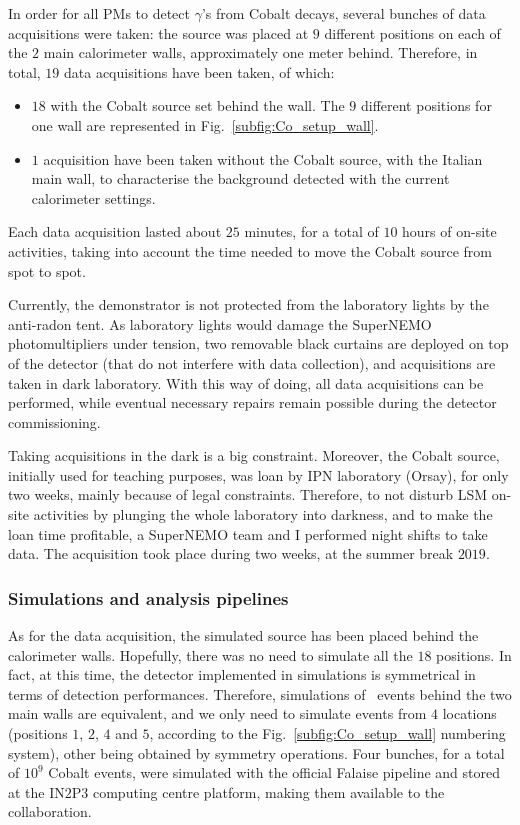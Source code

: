 In order for all PMs to detect $\gamma$'s from Cobalt decays, several bunches of data acquisitions were taken:
the source was placed at $9$ different positions on each of the $2$ main calorimeter walls, approximately one meter behind.
Therefore, in total, $19$ data acquisitions have been taken, of which:
\begin{itemize}
\item $18$ with the Cobalt source set behind the wall. The $9$ different positions for one wall are represented in Fig.~\ref{subfig:Co_setup_wall}.
\item $1$ acquisition have been taken without the Cobalt source, with the Italian main wall, to characterise the background detected with the current calorimeter settings.
\end{itemize}
Each data acquisition lasted about $25$ minutes, for a total of $10$ hours of on-site activities, taking into account the time needed to move the Cobalt source from spot to spot.

Currently, the demonstrator is not protected from the laboratory lights by the anti-radon tent.
As laboratory lights would damage the SuperNEMO photomultipliers under tension, two removable black curtains are deployed on top of the detector (that do not interfere with data collection), and acquisitions are taken in dark laboratory.
With this way of doing, all data acquisitions can be performed, while eventual necessary repairs remain possible during the detector commissioning.

Taking acquisitions in the dark is a big constraint.
Moreover, the Cobalt source, initially used for teaching purposes, was loan by IPN laboratory (Orsay), for only two weeks, mainly because of legal constraints.
Therefore, to not disturb LSM on-site activities by plunging the whole laboratory into darkness, and to make the loan time profitable, a SuperNEMO team and I performed night shifts to take data.
The acquisition took place during two weeks, at the summer break $2019$.

\subsubsection*{Simulations and analysis pipelines}


As for the data acquisition, the simulated source has been placed behind the calorimeter walls.
Hopefully, there was no need to simulate all the $18$ positions.
In fact, at this time, the detector implemented in simulations is symmetrical in terms of detection performances.
Therefore, simulations of \Co\ events behind the two main walls are equivalent, and we only need to simulate events from $4$ locations (positions $1$, $2$, $4$ and $5$, according to the Fig.~\ref{subfig:Co_setup_wall} numbering system), other being obtained by symmetry operations.
Four bunches, for a total of $10^{9}$ Cobalt events, were simulated with the official Falaise pipeline and stored at the IN$2$P$3$ computing centre platform, making them available to the collaboration.

